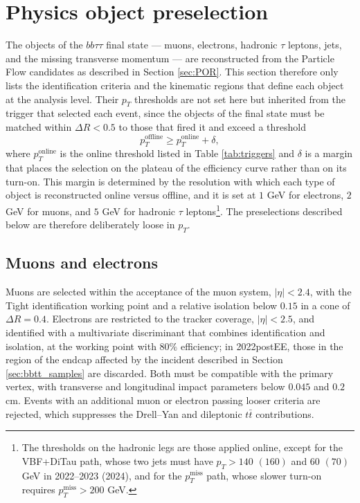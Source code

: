 \section{Physics object preselection}
\label{sec:bbtt_objects}
%
The objects of the $bb\tau\tau$ final state — muons, electrons, hadronic $\tau$ leptons, jets, and the missing transverse momentum — are reconstructed from the Particle Flow candidates as described in Section \ref{sec:POR}. This section therefore only lists the identification criteria and the kinematic regions that define each object at the analysis level. Their $p_T$ thresholds are not set here but inherited from the trigger that selected each event, since the objects of the final state must be matched within $\Delta R < 0.5$ to those that fired it and exceed a threshold
%
\begin{equation}
    p_{T}^{\text{offline}} \geq p_{T}^{\text{online}} + \delta,
    \label{eq:trigger_matching}
\end{equation}
%
where $p_{T}^{\text{online}}$ is the online threshold listed in Table \ref{tab:triggers} and $\delta$ is a margin that places the selection on the plateau of the efficiency curve rather than on its turn-on. This margin is determined by the resolution with which each type of object is reconstructed online versus offline, and it is set at $1$ GeV for electrons, $2$ GeV for muons, and $5$ GeV for hadronic $\tau$ leptons\footnote{The thresholds on the hadronic legs are those applied online, except for the VBF+DiTau path, whose two jets must have $p_{T} > 140$ $(160)$ and $60$ $(70)$ GeV in 2022--2023 (2024), and for the $p_T^\text{miss}$ path, whose slower turn-on requires $p_T^\text{miss} > 200$ GeV.}. The preselections described below are therefore deliberately loose in $p_T$.

\subsection{Muons and electrons}
%
Muons are selected within the acceptance of the muon system, $|\eta| < 2.4$, with the Tight identification working point and a relative isolation below $0.15$ in a cone of $\Delta R = 0.4$. Electrons are restricted to the tracker coverage, $|\eta| < 2.5$, and identified with a multivariate discriminant that combines identification and isolation, at the working point with $80\%$ efficiency; in 2022postEE, those in the region of the endcap affected by the incident described in Section \ref{sec:bbtt_samples} are discarded. Both must be compatible with the primary vertex, with transverse and longitudinal impact parameters below $0.045$ and $0.2$ cm. Events with an additional muon or electron passing looser criteria are rejected, which suppresses the Drell--Yan and dileptonic $t\bar{t}$ contributions.


